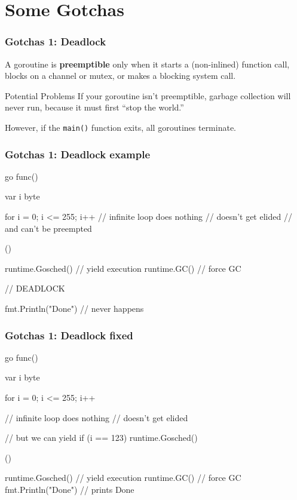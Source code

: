 \documentclass[compress,t,11pt]{beamer}
\begin{document}
\section{Some Gotchas}
\begin{frame}
    \frametitle{Gotchas 1: Deadlock}
    A goroutine is {\bf preemptible} only when it starts a (non-inlined)
    function call, blocks on a channel or mutex, or makes a blocking system call.
    \vspace{\baselineskip}
\begin{alertblock}{Potential Problems}
    If your goroutine isn't preemptible, garbage collection will never run,
    because it must first ``stop the world.''
\end{alertblock}
    \vspace{\baselineskip}
    However, if the {\tt main()} function exits, all goroutines terminate.
\end{frame}

\begin{frame}[fragile]
    \frametitle{Gotchas 1: Deadlock example}
\begin{golang}
go func() {
    var i byte

    for i = 0; i <= 255; i++ {
        // infinite loop does nothing
        // doesn't get elided
        // and can't be preempted
    }
}()

runtime.Gosched()    // yield execution
runtime.GC()         // force GC

// DEADLOCK

fmt.Println("Done")  // never happens
\end{golang}
\end{frame}

\begin{frame}[fragile]
    \frametitle{Gotchas 1: Deadlock fixed}
\begin{golang}
go func() {
    var i byte

    for i = 0; i <= 255; i++ {
        // infinite loop does nothing
        // doesn't get elided

        // but we can yield
		if (i == 123) {
			runtime.Gosched()
		}
    }
}()

runtime.Gosched()    // yield execution
runtime.GC()         // force GC
fmt.Println("Done")  // prints Done
\end{golang}
\end{frame}
\end{document}

